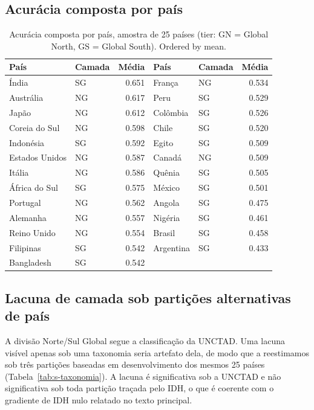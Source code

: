 \documentclass[11pt,a4paper]{article}
\begin{document}
\subsection{Acurácia composta por país}

\begin{table}[h]
\centering
\caption{Acurácia composta por país, amostra de 25 países
(tier: GN = Global North, GS = Global South). Ordered by mean.}
\label{tab:s-pais}
\footnotesize
\setlength{\tabcolsep}{4pt}
\begin{tabular}{llr@{\qquad}llr}
\toprule
País & Camada & Média & País & Camada & Média \\
\midrule
Índia & SG & 0.651 & França & NG & 0.534 \\
Austrália & NG & 0.617 & Peru & SG & 0.529 \\
Japão & NG & 0.612 & Colômbia & SG & 0.526 \\
Coreia do Sul & NG & 0.598 & Chile & SG & 0.520 \\
Indonésia & SG & 0.592 & Egito & SG & 0.509 \\
Estados Unidos & NG & 0.587 & Canadá & NG & 0.509 \\
Itália & NG & 0.586 & Quênia & SG & 0.505 \\
África do Sul & SG & 0.575 & México & SG & 0.501 \\
Portugal & NG & 0.562 & Angola & SG & 0.475 \\
Alemanha & NG & 0.557 & Nigéria & SG & 0.461 \\
Reino Unido & NG & 0.554 & Brasil & SG & 0.458 \\
Filipinas & SG & 0.542 & Argentina & SG & 0.433 \\
Bangladesh & SG & 0.542 &  & &  \\
\bottomrule
\end{tabular}
\end{table}

\subsection{Lacuna de camada sob partições alternativas de país}

A divisão Norte/Sul Global segue a classificação da UNCTAD. Uma lacuna visível
apenas sob uma taxonomia seria artefato dela, de modo que a reestimamos sob três
partições baseadas em desenvolvimento dos mesmos 25 países
(Tabela~\ref{tab:s-taxonomia}). A lacuna é significativa sob a UNCTAD e não
significativa sob toda partição traçada pelo IDH, o que é coerente com o gradiente
de IDH nulo relatado no texto principal.
\end{document}
